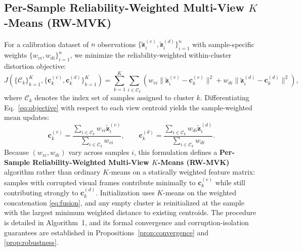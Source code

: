\documentclass[11pt, a4paper]{article}
\begin{document}
\subsection{Per-Sample Reliability-Weighted Multi-View \texorpdfstring{$K$}{K}-Means (RW-MVK)}
\label{subsec:rwkmeans}
For a calibration dataset of $n$ observations $\{\tilde{\mathbf{z}}^{(v)}_i, \tilde{\mathbf{z}}^{(d)}_i\}_{i=1}^n$ with sample-specific weights $\{w_{vi}, w_{di}\}_{i=1}^n$, we minimize the reliability-weighted within-cluster distortion objective:
\begin{equation}
J(\{\mathcal{C}_k\}_{k=1}^K, \{\mathbf{c}^{(v)}_k, \mathbf{c}^{(d)}_k\}_{k=1}^K) = \sum_{k=1}^{K}\sum_{i\in \mathcal{C}_k}
\left(
w_{vi}\|\tilde{\mathbf{z}}^{(v)}_i-\mathbf{c}^{(v)}_k\|^2
+
w_{di}\|\tilde{\mathbf{z}}^{(d)}_i-\mathbf{c}^{(d)}_k\|^2
\right),
\label{eq:objective}
\end{equation}
where $\mathcal{C}_k$ denotes the index set of samples assigned to cluster $k$. Differentiating Eq.~\eqref{eq:objective} with respect to each view centroid yields the sample-weighted mean updates:
\begin{equation}
\mathbf{c}^{(v)}_k =
\frac{\sum_{i\in\mathcal{C}_k} w_{vi}\tilde{\mathbf{z}}^{(v)}_i}
{\sum_{i\in\mathcal{C}_k} w_{vi}},
\qquad
\mathbf{c}^{(d)}_k =
\frac{\sum_{i\in\mathcal{C}_k} w_{di}\tilde{\mathbf{z}}^{(d)}_i}
{\sum_{i\in\mathcal{C}_k} w_{di}}.
\label{eq:centroid}
\end{equation}
Because $(w_{vi}, w_{di})$ vary across samples $i$, this formulation defines a \textbf{Per-Sample Reliability-Weighted Multi-View $K$-Means (RW-MVK)} algorithm rather than ordinary $K$-means on a statically weighted feature matrix: samples with corrupted visual frames contribute minimally to $\mathbf{c}^{(v)}_k$ while still contributing strongly to $\mathbf{c}^{(d)}_k$. Initialization uses $K$-means on the weighted concatenation \eqref{eq:fusion}, and any empty cluster is reinitialized at the sample with the largest minimum weighted distance to existing centroids. The procedure is detailed in Algorithm~1, and its formal convergence and corruption-isolation guarantees are established in Propositions~\ref{prop:convergence} and \ref{prop:robustness}.
\end{document}
